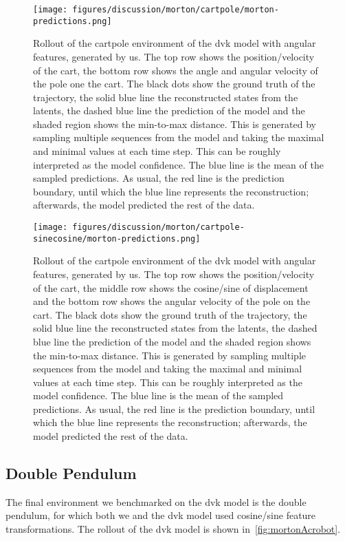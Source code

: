 		\begin{figure}
			\centering
			\texttt{[image: figures/discussion/morton/cartpole/morton-predictions.png]}
			\caption[Rollout of the cartpole environment of the \ac{dvk} model with angular features]{Rollout of the cartpole environment of the \ac{dvk} model with angular features, generated by us. The top row shows the position/velocity of the cart, the bottom row shows the angle and angular velocity of the pole one the cart. The black dots show the ground truth of the trajectory, the solid blue line the reconstructed states from the latents, the dashed blue line the prediction of the model and the shaded region shows the min-to-max distance. This is generated by sampling multiple sequences from the model and taking the maximal and minimal values at each time step. This can be roughly interpreted as the model confidence. The blue line is the mean of the sampled predictions. As usual, the red line is the prediction boundary, until which the blue line represents the reconstruction; afterwards, the model predicted the rest of the data.}
			\label{fig:mortonCartpoleAngle}
		\end{figure}
		\begin{figure}
			\centering
			\texttt{[image: figures/discussion/morton/cartpole-sinecosine/morton-predictions.png]}
			\caption[Rollout of the cartpole environment of the \ac{dvk} model with sine/cosine features]{Rollout of the cartpole environment of the \ac{dvk} model with angular features, generated by us. The top row shows the position/velocity of the cart, the middle row shows the cosine/sine of displacement and the bottom row shows the angular velocity of the pole on the cart. The black dots show the ground truth of the trajectory, the solid blue line the reconstructed states from the latents, the dashed blue line the prediction of the model and the shaded region shows the min-to-max distance. This is generated by sampling multiple sequences from the model and taking the maximal and minimal values at each time step. This can be roughly interpreted as the model confidence. The blue line is the mean of the sampled predictions. As usual, the red line is the prediction boundary, until which the blue line represents the reconstruction; afterwards, the model predicted the rest of the data.}
			\label{fig:mortonCartpoleSineCosine}
		\end{figure}

	\subsection{Double Pendulum}
		The final environment we benchmarked on the \ac{dvk} model is the double pendulum, for which both we and the \ac{dvk} model used cosine/sine feature transformations. The rollout of the \ac{dvk} model is shown in~\autoref{fig:mortonAcrobot}.


